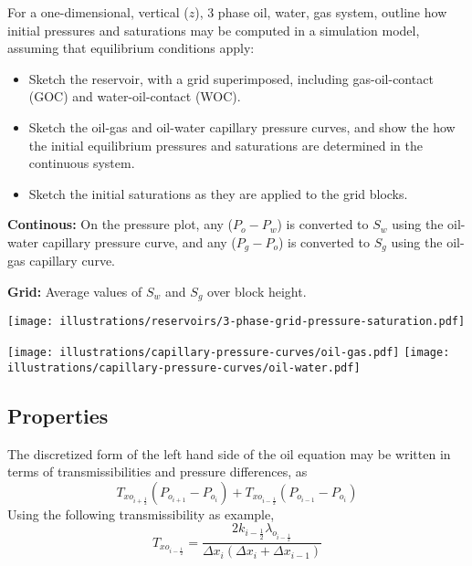 \begin{question}
  For a one-dimensional, vertical ($z$), 3 phase oil, water, gas system, outline how initial pressures and saturations may be computed in a simulation model, assuming that equilibrium conditions apply:
  \begin{itemize}
    \item Sketch the reservoir, with a grid superimposed, including gas-oil-contact (GOC) and water-oil-contact (WOC).
    \item Sketch the oil-gas and oil-water capillary pressure curves, and show the how the initial equilibrium pressures and saturations are determined in the continuous system.
    \item Sketch the initial saturations as they are applied to the grid blocks.
  \end{itemize}
\end{question}

\noindent \textbf{Continous:} On the pressure plot, any ($P_o - P_w$) is converted to $S_w$ using the oil-water capillary pressure curve, and any ($P_g - P_o$) is converted to $S_g$ using the oil-gas capillary curve.

\noindent \textbf{Grid:} Average values of $S_w$ and $S_g$ over block height.

\centerline{\texttt{[image: illustrations/reservoirs/3-phase-grid-pressure-saturation.pdf]}}

\begin{center}
  \texttt{[image: illustrations/capillary-pressure-curves/oil-gas.pdf]}
  \texttt{[image: illustrations/capillary-pressure-curves/oil-water.pdf]}
\end{center}



\clearpage
\subsection{Properties} %
\label{sub:properties}

\begin{question}
  The discretized form of the left hand side of the oil equation may be written in terms of transmissibilities and pressure differences, as
  \begin{equation}
    T_{xo_{i+\frac{1}{2}}} \left( P_{o_{i+1}} - P_{o_i} \right)
   +T_{xo_{i-\frac{1}{2}}} \left( P_{o_{i-1}} - P_{o_i} \right)
  \end{equation}
  Using the following transmissibility as example,
  \begin{equation}
    T_{xo_{i-\frac{1}{2}}} = \frac{2k_{i-\frac{1}{2}} \lambda_{o_{i-\frac{1}{2}}}}
      {\Delta x_i \left( \Delta x_i + \Delta x_{i-1} \right)}
  \end{equation}
\end{question}

